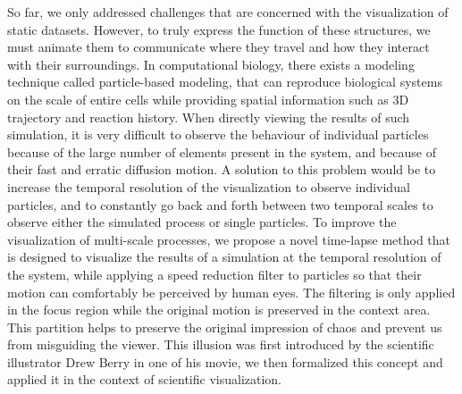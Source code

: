 So far, we only addressed challenges that are concerned with the visualization of static datasets.
However, to truly express the function of these structures, we must animate them to communicate where they travel and how they interact with their surroundings.
In computational biology, there exists a modeling technique called particle-based modeling, that can reproduce biological systems on the scale of entire cells while providing spatial information such as 3D trajectory and reaction history.
When directly viewing the results of such simulation, it is very difficult to observe the behaviour of individual particles because of the large number of elements present in the system, and because of their fast and erratic diffusion motion.
A solution to this problem would be to increase the temporal resolution of the visualization to observe individual particles, and to constantly go back and forth between two temporal scales to observe either the simulated process or single particles.
To improve the visualization of multi-scale processes, we propose a novel time-lapse method that is designed to visualize the results of a simulation at the temporal resolution of the system, while applying a speed reduction filter to particles so that their motion can comfortably be perceived by human eyes.
The filtering is only applied in the focus region while the original motion is preserved in the context area.
This partition helps to preserve the original impression of chaos and prevent us from misguiding the viewer.
This illusion was first introduced by the scientific illustrator Drew Berry in one of his movie, we then formalized this concept and applied it in the context of scientific visualization.

